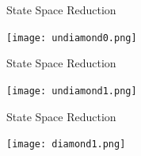 \documentclass[xcolor=dvipsnames]{beamer}
\begin{document}
\begin{frame}{State Space Reduction}
	\begin{center}
	\texttt{[image: undiamond0.png]}
	\end{center}
\end{frame}
\begin{frame}{State Space Reduction}
	\begin{center}
	\texttt{[image: undiamond1.png]}
	\end{center}
\end{frame}
\begin{frame}{State Space Reduction}
	\begin{center}
	\texttt{[image: diamond1.png]}
	\end{center}
\end{frame}
\end{document}
